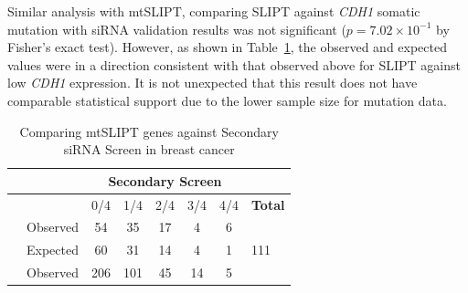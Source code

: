 Similar analysis with mtSLIPT, comparing SLIPT against \textit{CDH1} somatic mutation with siRNA validation results was not significant ($p=7.02 \times 10^{-1}$ by Fisher's exact test). However,  as shown in Table~\ref{tab:secondary_screen_mtSL}, the observed and expected values were in a direction consistent with that observed above for SLIPT against low \textit{CDH1} expression. It is not unexpected that this result does not have comparable statistical support due to the lower sample size for mutation data. 

\begin{table}[!ht]
\caption{Comparing mtSLIPT genes against Secondary siRNA Screen in breast cancer}
\label{tab:secondary_screen_mtSL}
\begin{center}
\begin{tabular}{>{\cellcolor{white}}rrcccccl}
                                                                              &                                                           & \multicolumn{5}{c}{\bfseries Secondary Screen}                                                                                     &                                           \\ \cline{3-7}
\rowcolor{black!10}
                                                                              & \multicolumn{1}{r|}{\cellcolor{white}}                    & 0/4                      & 1/4                      & 2/4                     & 3/4                     & \multicolumn{1}{c|}{4/4} & \cellcolor{white} \textbf{Total}          \\ \cline{2-8} 
\rowcolor{black!5}
\multicolumn{1}{r|}{\cellcolor{white}}                                        & \multicolumn{1}{r|}{Observed}                             & 54                       & 35                       & 17                      & 4                       & \multicolumn{1}{c|}{6}   &  \multicolumn{1}{l|}{}                     \\
\rowcolor{black!10}
\multicolumn{1}{r|}{\cellcolor{white} \multirow{-2}{*}{\bfseries mtSLIPT$+$}} & \multicolumn{1}{r|}{Expected}                             & 60                       & 31                       & 14                      & 4                       & \multicolumn{1}{c|}{1}   & \multicolumn{1}{l|}{\multirow{-2}{*}{111}}    \\ \cline{2-8} 
\rowcolor{black!5}
\multicolumn{1}{r|}{\cellcolor{white}}                                        & \multicolumn{1}{r|}{Observed}                             & 206                      & 101                      & 45                      & 14                      & \multicolumn{1}{c|}{5}   & \multicolumn{1}{l|}{}                     \\

\end{tabular}
\end{center}
\end{table}
